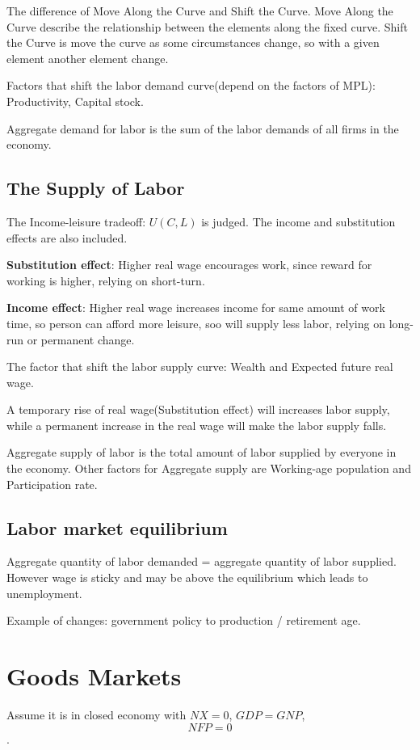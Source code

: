\documentclass[10pt, a4paper]{article}
\begin{document}
            The difference of Move Along the Curve and Shift the Curve. Move Along the Curve describe the relationship between the elements along the fixed curve. Shift the Curve is move the curve as some circumstances change, so with a given element another element change.

            Factors that shift the labor demand curve(depend on the factors of MPL): Productivity, Capital stock.
            
            Aggregate demand for labor is the sum of the labor demands of all firms in the economy. 
            
        \subsection{The Supply of Labor}
            The Income-leisure tradeoff: $U(C, L)$ is judged. The income and substitution effects are also included. 

            \textbf{Substitution effect}: Higher real wage encourages work, since reward for working is higher, relying on short-turn.

            \textbf{Income effect}: Higher real wage increases income for same amount of work time, so person can afford more leisure, soo will supply less labor, relying on long-run or permanent change. 
            
            The factor that shift the labor supply curve: Wealth and Expected future real wage. 

            A temporary rise of real wage(Substitution effect) will increases labor supply, while a permanent increase in the real wage will make the labor supply falls. 

            Aggregate supply of labor is the total amount of labor supplied by everyone in the economy.
            Other factors for Aggregate supply are Working-age population and Participation rate. 
        \subsection{Labor market equilibrium}
            Aggregate quantity of labor demanded = aggregate quantity of labor supplied. However wage is sticky and may be above the equilibrium which leads to unemployment. 

            Example of changes: government policy to production / retirement age. 
    \section{Goods Markets}
        Assume it is in closed economy with $NX = 0$, $GDP = GNP$, $$NFP = 0$$.
        
\end{document}
